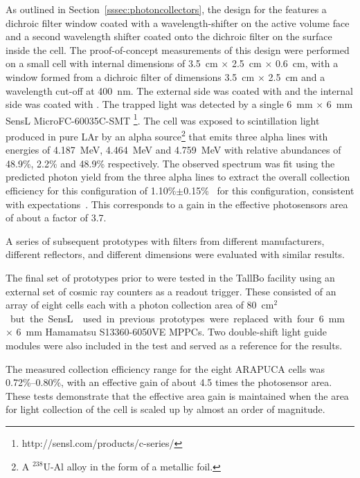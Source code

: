 As outlined in Section~\ref{sssec:photoncollectors}, the design for the  features a dichroic filter window coated with a wavelength-shifter on the \lar active volume face and a second wavelength shifter coated onto the dichroic filter on the surface inside the cell.  
The proof-of-concept measurements of this design were performed on a small cell with internal dimensions of \SI{3.5}{cm} $\times$ \SI{2.5}{cm} $\times$ \SI{0.6}{cm}, with a window formed from a dichroic filter of  dimensions \SI{3.5}{cm} $\times$ \SI{2.5}{cm} and a wavelength cut-off at \SI{400}{nm}. The external side was coated with  and the internal side was coated with . 
The trapped light was detected by a single \SI{6}{mm} $\times$ \SI{6}{mm} SensL MicroFC-60035C-SMT \footnote{http://sensl.com/products/c-series/}. The cell was exposed to scintillation light produced in pure LAr by an alpha source\footnote{A $^{238}$U-Al alloy in the form of a metallic foil.} that emits three alpha lines with energies of  \SI{4.187}{MeV}, \SI{4.464}{MeV} and \SI{4.759}{MeV} with relative abundances of 48.9\%, 2.2\% and 48.9\% respectively. 
The observed spectrum was fit using the predicted photon yield from the three alpha lines to extract the overall collection efficiency for this configuration of 1.10\%$\pm$0.15\%~\cite{Segreto:2018jdx} for this configuration, consistent with  expectations~\cite{Marinho:2018doi}. This corresponds to a gain in the effective photosensors area of about a factor of \num{3.7}. 



A series of subsequent prototypes with filters from different manufacturers, different reflectors, and different dimensions were evaluated with similar results. 

The final set of prototypes prior to  were tested in the TallBo facility using an external set of cosmic ray counters as a readout trigger. These consisted of an array of eight  cells each with a photon collection area of \SI{80}{cm$^2$} but the SensL  used in previous prototypes were replaced with four \SI{6}{mm} $\times$ \SI{6}{mm} Hamamatsu S13360-6050VE MPPCs. 
Two double-shift light guide modules were also included in the test and served as a reference for the  results.

The measured collection efficiency range for the eight ARAPUCA cells was 0.72\%--0.80\%, with an effective  gain of about 4.5 times the photosensor area. These tests demonstrate that the effective area gain is maintained when the area for light collection of the cell is scaled up by almost an order of magnitude.

